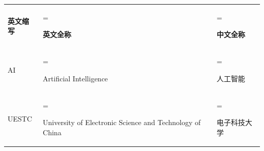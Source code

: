\uestcacronyms

\begingroup
\renewcommand{\arraystretch}{1.3}
\setlength{\tabcolsep}{9pt}
\noindent
\begin{tabularx}{\linewidth}{%
    >{\normalsize}l
    >{\normalsize\hsize=1.2\hsize\linewidth=\hsize\raggedright\arraybackslash}X
    >{\normalsize\hsize=0.8\hsize\linewidth=\hsize\raggedright\arraybackslash}X}
    \textbf{英文缩写} & \textbf{英文全称} & \textbf{中文全称} \\
    AI & Artificial Intelligence & 人工智能 \\
    UESTC & University of Electronic Science and Technology of China & 电子科技大学 \\
\end{tabularx}
\par
\endgroup
